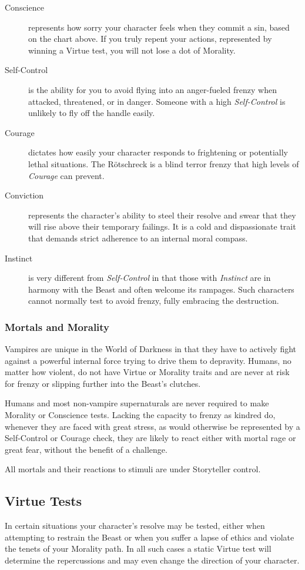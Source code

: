 \begin{description}
	\item[Conscience] represents how sorry your character feels when they commit 
	a sin, based on the chart above.  If you truly repent your actions, represented 
	by winning a Virtue test, you will not lose a dot of Morality.
	\item[Self-Control] is the ability for you to avoid flying into an anger-fueled 
	frenzy when attacked, threatened, or in danger.  Someone with a high 
	\emph{Self-Control} is unlikely to fly off the handle easily.
	\item[Courage] dictates how easily your character responds to frightening or 
	potentially lethal situations.  The R\"{o}tschreck is a blind terror frenzy 
	that high levels of \emph{Courage} can prevent.
	\item[Conviction] represents the character's ability to steel their resolve and 
	swear that they will rise above their temporary failings.  It is a cold and 
	dispassionate trait that demands strict adherence to an internal moral compass.
	\item[Instinct] is very different from \emph{Self-Control} in that those with 
	\emph{Instinct} are in harmony with the Beast and often welcome its rampages.  
	Such characters cannot normally test to avoid frenzy, fully embracing the destruction.
\end{description}

\subsubsection{Mortals and Morality}
Vampires are unique in the World of Darkness in that they have to actively fight against 
a powerful internal force trying to drive them to depravity.  Humans, no matter how violent, 
do not have Virtue or Morality traits and are never at risk for frenzy or slipping further 
into the Beast's clutches.

Humans and most non-vampire supernaturals are never required to make Morality or Conscience 
tests.  Lacking the capacity to frenzy as kindred do, whenever they are faced with great stress, 
as would otherwise be represented by a Self-Control or Courage check, they are likely to react 
either with mortal rage or great fear, without the benefit of a challenge.

All mortals and their reactions to stimuli are under Storyteller control.

\subsection{Virtue Tests}
In certain situations your character's resolve may be tested, either when attempting 
to restrain the Beast or when you suffer a lapse of ethics and violate the tenets of 
your Morality path.  In all such cases a static Virtue test will determine the 
repercussions and may even change the direction of your character.

